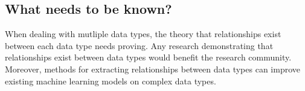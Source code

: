\subsection{What needs to be known?}

When dealing with mutliple data types, the theory that relationships exist between each data type needs proving.  Any research demonstrating that relationships exist between data types would benefit the research community.  Moreover, methods for extracting relationships between data types can improve existing machine learning models on complex data types.  

